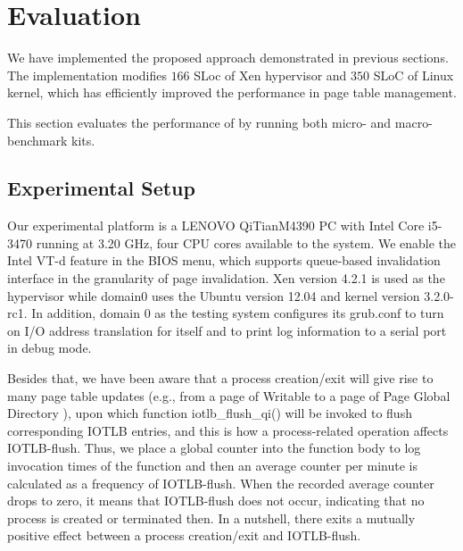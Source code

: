 
\section{Evaluation} \label{sec:eva}

We have implemented the proposed approach demonstrated in previous sections. The implementation modifies %
$166$ SLoc of Xen hypervisor and $350$ SLoC of Linux kernel, which has efficiently improved the performance in page table management.

This section evaluates the performance of \name by running both micro- and macro-benchmark kits.

\subsection{Experimental Setup}

Our experimental platform is a LENOVO QiTianM4390 PC with Intel Core i5-3470 running at 3.20 GHz, four CPU cores available to the system. We enable the Intel VT-d feature in the BIOS menu, which supports queue-based invalidation interface in the granularity of page invalidation. Xen version 4.2.1 is used as the hypervisor while domain0 uses the Ubuntu version 12.04 and kernel version 3.2.0-rc1. In addition, domain 0 as the testing system configures its grub.conf to turn on I/O address translation for itself and to print log information to a serial port in debug mode.

Besides that, we have been aware that a process creation/exit will give rise to many page table updates (e.g., from a page of Writable to a page of Page Global Directory ), upon which function iotlb\_flush\_qi() will be invoked to flush corresponding IOTLB entries, and this is how a process-related operation affects IOTLB-flush. Thus, we place a global counter into the function body to log invocation times of the function and then an average counter per minute is calculated as a frequency of IOTLB-flush. When the recorded average counter drops to zero, it means that IOTLB-flush does not occur, indicating that no process is created or terminated then. In a nutshell, there exits a mutually positive effect between a process creation/exit and IOTLB-flush.

